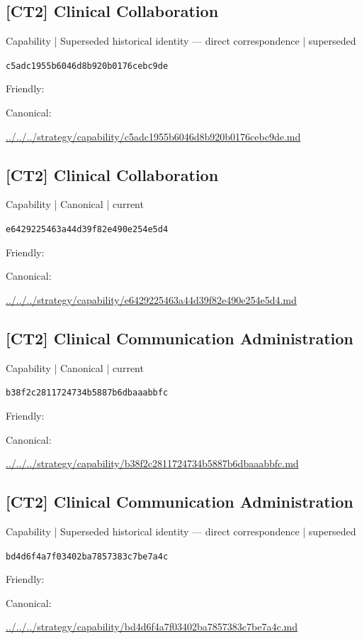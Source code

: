 \documentclass[10pt,a4paper]{article}
\begin{document}
\subsection*{[CT2] Clinical Collaboration}
{\small Capability | Superseded historical identity — direct correspondence | superseded}\par
\texttt{c5adc1955b6046d8b920b0176cebc9de}\par
Friendly: \par
Canonical: \par
{\footnotesize\url{../../../strategy/capability/c5adc1955b6046d8b920b0176cebc9de.md}}\par
\subsection*{[CT2] Clinical Collaboration}
{\small Capability | Canonical | current}\par
\texttt{e6429225463a44d39f82e490e254e5d4}\par
Friendly: \par
Canonical: \par
{\footnotesize\url{../../../strategy/capability/e6429225463a44d39f82e490e254e5d4.md}}\par
\subsection*{[CT2] Clinical Communication Administration}
{\small Capability | Canonical | current}\par
\texttt{b38f2c2811724734b5887b6dbaaabbfc}\par
Friendly: \par
Canonical: \par
{\footnotesize\url{../../../strategy/capability/b38f2c2811724734b5887b6dbaaabbfc.md}}\par
\subsection*{[CT2] Clinical Communication Administration}
{\small Capability | Superseded historical identity — direct correspondence | superseded}\par
\texttt{bd4d6f4a7f03402ba7857383c7be7a4c}\par
Friendly: \par
Canonical: \par
{\footnotesize\url{../../../strategy/capability/bd4d6f4a7f03402ba7857383c7be7a4c.md}}\par
\end{document}
